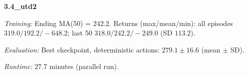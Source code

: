 \noindent\textbf{3.4_utd2}\par
\emph{Training:} Ending MA(50) = $242.2$. Returns (max/mean/min): all episodes $319.0/192.2/-648.2$; last 50 $318.0/242.2/-249.0$ (SD $113.2$).\par
\emph{Evaluation:} Best checkpoint, deterministic actions: $279.1\pm 16.6$ (mean $\pm$ SD).\par
\emph{Runtime:} $27.7$ minutes (parallel run).\par
